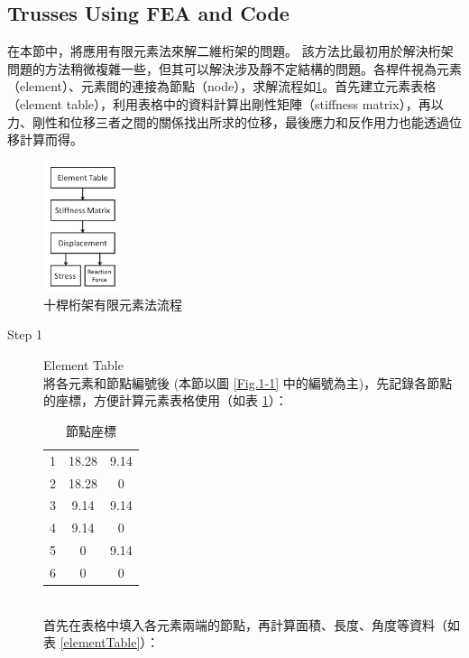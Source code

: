\documentclass[12pt]{article}
\numberwithin{figure}{section}
\numberwithin{table}{section}
\numberwithin{equation}{section}
\begin{document}
\begin{CJK}{UTF8}{bkai}
\subsection{Trusses Using FEA and Code}
在本節中，將應用有限元素法來解二維桁架的問題。 該方法比最初用於解決桁架問題的方法稍微複雜一些，但其可以解決涉及靜不定結構的問題。各桿件視為元素（element）、元素間的連接為節點（node），求解流程如\ref{Fig.2-1}。首先建立元素表格（element table），利用表格中的資料計算出剛性矩陣（stiffness matrix），再以力、剛性和位移三者之間的關係找出所求的位移，最後應力和反作用力也能透過位移計算而得。
\begin{figure}[H] %
    \centering %
    \includegraphics[width=0.2\textwidth]{2-1.jpg} %
    \caption{十桿桁架有限元素法流程} %
    \label{Fig.2-1} %
\end{figure}

\begin{description}
	\item [Step 1] Element Table\\
		將各元素和節點編號後 (本節以圖 \ref{Fig.1-1} 中的編號為主)，先記錄各節點的座標，方便計算元素表格使用（如表 \ref{nodeCoor}）：

		\begin{table}[h]
		\caption{節點座標}
		\label{nodeCoor}
		\renewcommand{\arraystretch}{1.1}
		\centering
		\begin{tabular}{ccc}
		\hline
		\makebox[2.5cm]{node} & \makebox[2cm]{$x$} & \makebox[2cm]{$y$} \\
		\hline
		1   &18.28 & 9.14 \\
		2   &18.28 & 0 \\
		3   & 9.14  & 9.14 \\
		4   &9.14  & 0 \\
		5   & 0   &9.14 \\
		6   & 0   & 0 \\
		\hline
		\end{tabular}
		\end{table}
        ~\\
		首先在表格中填入各元素兩端的節點，再計算面積、長度、角度等資料（如表 \ref{elementTable}）：


\end{description}
\end{CJK}
\end{document}
